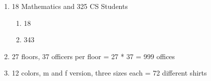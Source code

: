 \documentclass[11pt]{article}
\begin{document}
\begin{enumerate}

    \item 18 Mathematics and 325 CS Students
    \begin{enumerate}
        \item 18
        \item 343
    \end{enumerate}

    \item 27 floors, 37 officers per floor = 27 * 37 = 999 offices

    \item 12 colors, m and f version, three sizes each = 72 different shirts
\end{enumerate}
\end{document}
